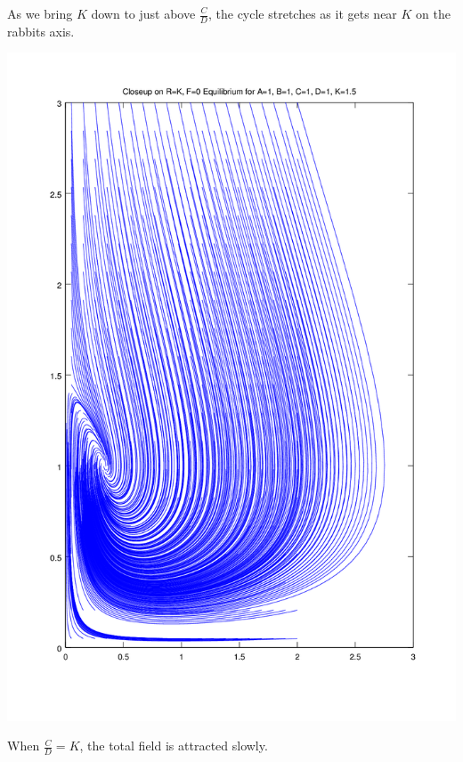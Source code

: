 \documentclass{article}
\begin{document}
As we bring $K$ down to just above $\frac{C}{D}$,
	the cycle stretches as it gets near $K$ on the 
	rabbits axis.

\includegraphics[width=\textwidth]{plots/phase-potrait-near-degenerate.png}

When $\frac{C}{D} = K$, the total field is attracted slowly.
\end{document}
